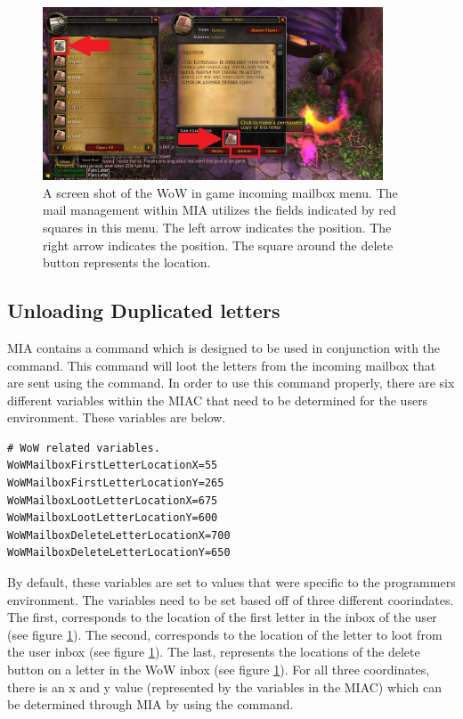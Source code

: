 \begin{figure}[h]
	\centering
	\includegraphics[width=0.9\textwidth]{Images/WoWScrnShot_040518_115947b.jpg}
	\caption{A screen shot of the WoW in game incoming mailbox menu. The mail management within MIA utilizes the fields indicated by red squares in this menu. The left arrow indicates the  position. The right arrow indicates the  position. The square around the delete button represents the  location.} \label{wow mailbox receive}
\end{figure}

\subsection{Unloading Duplicated letters}

MIA contains a command  which is designed to be used in conjunction with the  command. This command will loot the letters from the incoming mailbox that are sent using the  command. In order to use this command properly, there are six different variables within the MIAC that need to be determined for the users environment. These variables are below.

\begin{lstlisting}
# WoW related variables.
WoWMailboxFirstLetterLocationX=55
WoWMailboxFirstLetterLocationY=265
WoWMailboxLootLetterLocationX=675
WoWMailboxLootLetterLocationY=600
WoWMailboxDeleteLetterLocationX=700
WoWMailboxDeleteLetterLocationY=650
\end{lstlisting}

By default, these variables are set to values that were specific to the programmers environment. The variables need to be set based off of three different coorindates. The first,  corresponds to the location of the first letter in the inbox of the user (see figure \ref{wow mailbox receive}). The second,  corresponds to the location of the letter to loot from the user inbox (see figure \ref{wow mailbox receive}). The last,  represents the locations of the delete button on a letter in the WoW inbox (see figure \ref{wow mailbox receive}).  For all three coordinates, there is an x and y value (represented by the variables in the MIAC) which can be determined through MIA by using the  command.
